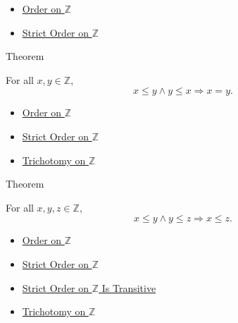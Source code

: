 \begin{dependencies}
\begin{itemize}
  \item \hyperref[def:order-on-z]{Order on $\mathbb{Z}$}
  \item \hyperref[def:strict-order-on-z]{Strict Order on $\mathbb{Z}$}
\end{itemize}
\end{dependencies}

\begin{theorembox}{Theorem}
\begin{theorem}
\label{thm:order-on-z-antisymmetric}
For all $x,y\in\mathbb{Z}$,
\[
x\le y\land y\le x \Longrightarrow x=y.
\]
\end{theorem}
\end{theorembox}

\begin{dependencies}
\begin{itemize}
  \item \hyperref[def:order-on-z]{Order on $\mathbb{Z}$}
  \item \hyperref[def:strict-order-on-z]{Strict Order on $\mathbb{Z}$}
  \item \hyperref[thm:trichotomy-on-z]{Trichotomy on $\mathbb{Z}$}
\end{itemize}
\end{dependencies}

\begin{theorembox}{Theorem}
\begin{theorem}
\label{thm:order-on-z-transitive}
For all $x,y,z\in\mathbb{Z}$,
\[
x\le y\land y\le z \Longrightarrow x\le z.
\]
\end{theorem}
\end{theorembox}

\begin{dependencies}
\begin{itemize}
  \item \hyperref[def:order-on-z]{Order on $\mathbb{Z}$}
  \item \hyperref[def:strict-order-on-z]{Strict Order on $\mathbb{Z}$}
  \item \hyperref[thm:strict-order-on-z-transitive]{Strict Order on $\mathbb{Z}$ Is Transitive}
  \item \hyperref[thm:trichotomy-on-z]{Trichotomy on $\mathbb{Z}$}
\end{itemize}
\end{dependencies}

